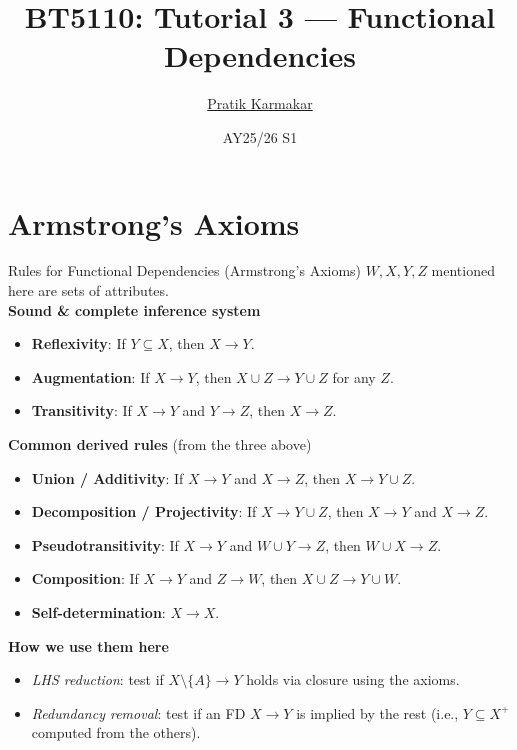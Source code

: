\documentclass{beamer}
\title{BT5110: Tutorial 3 — Functional Dependencies}
\author{\href{https://pratik2358.github.io/}{Pratik Karmakar}}
\institute{School of Computing,\\ National University of Singapore}
\date{AY25/26 S1}
\begin{document}
\begin{frame}
  \titlepage
\end{frame}


\section{Armstrong's Axioms}
\begin{frame}{Rules for Functional Dependencies (Armstrong's Axioms)}
\scriptsize
$W, X, Y, Z$ mentioned here are \alert{sets} of attributes.\\
\textbf{Sound \& complete inference system}
\begin{itemize}\setlength\itemsep{0.25em}
  \item \textbf{Reflexivity}:\; If $Y\subseteq X$, then $X \to Y$.
  \item \textbf{Augmentation}:\; If $X \to Y$, then $X\cup Z \to Y\cup Z$ for any $Z$.
  \item \textbf{Transitivity}:\; If $X \to Y$ and $Y \to Z$, then $X \to Z$.
\end{itemize}

\medskip
\textbf{Common derived rules} (from the three above)
\begin{itemize}\setlength\itemsep{0.25em}
  \item \textbf{Union / Additivity}:\; If $X \to Y$ and $X \to Z$, then $X \to Y\cup Z$.
  \item \textbf{Decomposition / Projectivity}:\; If $X \to Y\cup Z$, then $X \to Y$ and $X \to Z$.
  \item \textbf{Pseudotransitivity}:\; If $X \to Y$ and $W\cup Y \to Z$, then $W\cup X \to Z$.
  \item \textbf{Composition}:\; If $X \to Y$ and $Z \to W$, then $X\cup Z \to Y\cup W$.
  \item \textbf{Self-determination}:\; $X \to X$.
\end{itemize}

\medskip
\textbf{How we use them here}
\begin{itemize}\setlength\itemsep{0.25em}
  \item \emph{LHS reduction}: test if $X\setminus\{A\}\to Y$ holds via closure using the axioms.
  \item \emph{Redundancy removal}: test if an FD $X\to Y$ is implied by the rest (i.e., $Y\subseteq X^+$ computed from the others).
\end{itemize}
\end{frame}
\end{document}
